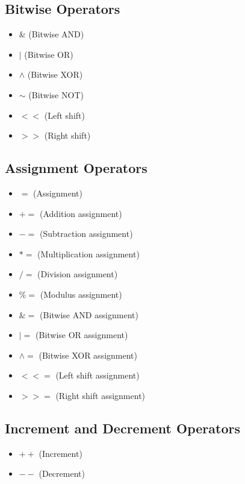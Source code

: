 \documentclass{report}
\begin{document}
    \begin{minipage}[t]{0.47\textwidth}
        \subsection{Bitwise Operators}
        \begin{itemize}
          \item \( \& \) (Bitwise AND)
          \item \( | \) (Bitwise OR)
          \item \( \wedge\) (Bitwise XOR)
          \item \( \sim \) (Bitwise NOT)
          \item \( << \) (Left shift)
          \item \( >> \) (Right shift)
        \end{itemize}
    \end{minipage}
    \bigbreak \noindent 
    \begin{minipage}[t]{0.47\textwidth}
     \subsection{Assignment Operators}
    \begin{itemize}
      \item \( = \) (Assignment)
      \item \( += \) (Addition assignment)
      \item \( -= \) (Subtraction assignment)
      \item \( *= \) (Multiplication assignment)
      \item \( /= \) (Division assignment)
      \item \( \%= \) (Modulus assignment)
      \item \( \&= \) (Bitwise AND assignment)
      \item \( |= \) (Bitwise OR assignment)
      \item \( \wedge= \) (Bitwise XOR assignment)
      \item \( <<= \) (Left shift assignment)
      \item \( >>= \) (Right shift assignment)
    \end{itemize}
    \end{minipage}
    \begin{minipage}[t]{0.47\textwidth}
        \subsection{Increment and Decrement Operators}
        \begin{itemize}
          \item \( ++ \) (Increment)
          \item \( -- \) (Decrement)
        \end{itemize}
    \end{minipage}
\end{document}
